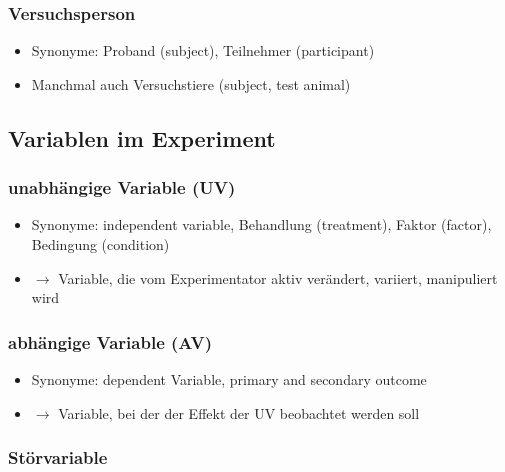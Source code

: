 \documentclass[
]{book}
\providecommand{\tightlist}{%
  \setlength{\itemsep}{0pt}\setlength{\parskip}{0pt}}
\begin{document}
\hypertarget{versuchsperson}{%
\subsubsection{Versuchsperson}\label{versuchsperson}}

\begin{itemize}
\item
  Synonyme: Proband (subject), Teilnehmer (participant)
\item
  Manchmal auch Versuchstiere (subject, test animal)
\end{itemize}

\hypertarget{variablen-im-experiment}{%
\subsection{Variablen im Experiment}\label{variablen-im-experiment}}

\hypertarget{unabhuxe4ngige-variable-uv}{%
\subsubsection{unabhängige Variable (UV)}\label{unabhuxe4ngige-variable-uv}}

\begin{itemize}
\tightlist
\item
  Synonyme: independent variable, Behandlung (treatment), Faktor (factor), Bedingung (condition)
\item
  \(\rightarrow\) Variable, die vom Experimentator aktiv verändert, variiert, manipuliert wird
\end{itemize}

\hypertarget{abhuxe4ngige-variable-av}{%
\subsubsection{abhängige Variable (AV)}\label{abhuxe4ngige-variable-av}}

\begin{itemize}
\tightlist
\item
  Synonyme: dependent Variable, primary and secondary outcome
\item
  \(\rightarrow\) Variable, bei der der Effekt der UV beobachtet werden soll
\end{itemize}

\hypertarget{stuxf6rvariable}{%
\subsubsection{Störvariable}\label{stuxf6rvariable}}
\end{document}
